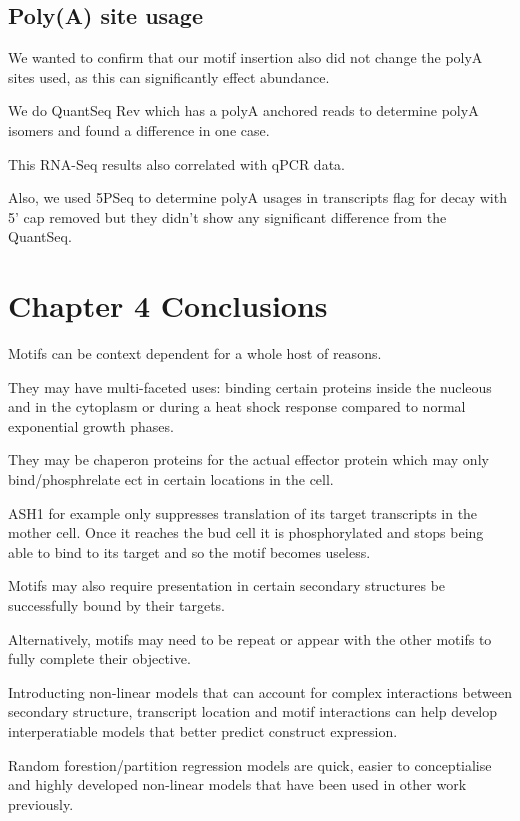 \documentclass{SBCbookchapter}
\begin{document}
\subsection{Poly(A) site usage}

We wanted to confirm that our motif insertion also did not change the polyA sites used, as this can significantly effect abundance.

We do QuantSeq Rev which has a polyA anchored reads to determine polyA isomers and found a difference in one case.

This RNA-Seq results also correlated with qPCR data.

Also, we used 5PSeq to determine polyA usages in transcripts flag for decay with 5' cap removed but they didn't show any significant difference from the QuantSeq.

\section{Chapter 4 Conclusions}

Motifs can be context dependent for a whole host of reasons.

They may have multi-faceted uses: binding certain proteins inside the nucleous and in the cytoplasm or during a heat shock response compared to normal exponential growth phases.

They may be chaperon proteins for the actual effector protein which may only bind/phosphrelate ect in certain locations in the cell.

ASH1 for example only suppresses translation of its target transcripts in the mother cell. Once it reaches the bud cell it is phosphorylated and stops being able to bind to its target and so the motif becomes useless.

Motifs may also require presentation in certain secondary structures be successfully bound by their targets.

Alternatively, motifs may need to be repeat or appear with the other motifs to fully complete their objective.

Introducting non-linear models that can account for complex interactions between secondary structure, transcript location and motif interactions can help develop interperatiable models that better predict construct expression.

Random forestion/partition regression models are quick, easier to conceptialise and highly developed non-linear models that have been used in other work previously.



\end{document}

